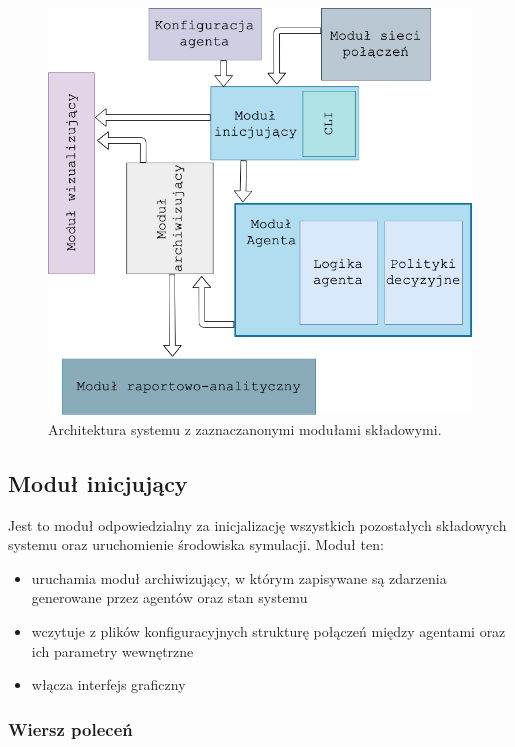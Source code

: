 \documentclass{article}
\begin{document}
\begin{figure}[H]
	\centering
	\includegraphics[width=\textwidth, height=0.7\textheight]{./system-arch.png}
	\caption{Architektura systemu z zaznaczanonymi modułami składowymi.}
	\label{arch1}
\end{figure}

\subsection{Moduł inicjujący}

Jest to moduł odpowiedzialny za inicjalizację wszystkich pozostałych składowych systemu oraz 
uruchomienie środowiska symulacji. Moduł ten:

\begin{itemize}

\item uruchamia moduł archiwizujący, w którym zapisywane są zdarzenia generowane przez agentów oraz stan systemu 
\item wczytuje z plików konfiguracyjnych strukturę połączeń między agentami oraz ich parametry wewnętrzne 
\item włącza interfejs graficzny   

\end{itemize}

\subsubsection{Wiersz poleceń}
\end{document}
